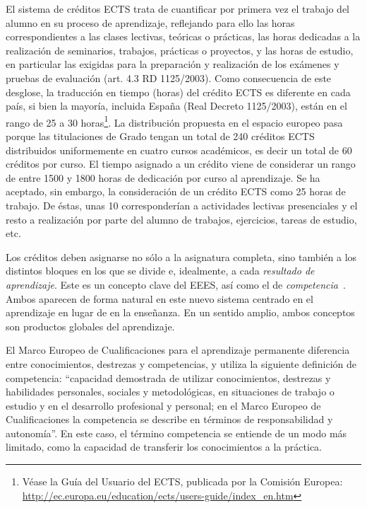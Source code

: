 El sistema de créditos ECTS trata de cuantificar por primera vez el trabajo del alumno en su proceso de aprendizaje, reflejando para ello las horas correspondientes a las clases lectivas, teóricas o prácticas, las horas dedicadas a la realización de seminarios, trabajos, prácticas o proyectos, y las horas de estudio, en particular las exigidas para la preparación y realización de los exámenes y pruebas de evaluación (art. 4.3 RD 1125/2003). Como consecuencia de este desglose, la traducción en tiempo (horas) del crédito ECTS es diferente en cada país, si bien la mayoría, incluida España (Real Decreto 1125/2003), están en el rango de 25 a 30 horas\footnote{Véase la Guía del Usuario del ECTS, publicada por la Comisión Europea: \url{http://ec.europa.eu/education/ects/users-guide/index_en.htm}}. La distribución propuesta en el espacio europeo pasa porque las titulaciones de Grado tengan un total de 240 créditos ECTS distribuidos uniformemente en cuatro cursos académicos, es decir un total de 60 créditos por curso. El tiempo asignado a un crédito viene de considerar un rango de entre 1500 y 1800 horas de dedicación por curso al aprendizaje. Se ha aceptado, sin embargo, la consideración de un crédito ECTS como 25 horas de trabajo. De éstas, unas 10 corresponderían a actividades lectivas presenciales y el resto a realización por parte del alumno de trabajos, ejercicios, tareas de estudio, etc. 

Los créditos deben asignarse no sólo a la asignatura completa, sino también a los distintos bloques en los que se divide e, idealmente, a cada \emph{resultado de aprendizaje}. Este es un concepto clave del EEES, así como el de \emph{competencia}~\cite{yaniz_villardon_2006}. Ambos aparecen de forma natural en este nuevo sistema centrado en el aprendizaje en lugar de en la enseñanza. En un sentido amplio, ambos conceptos son productos globales del aprendizaje.

El Marco Europeo de Cualificaciones para el aprendizaje permanente diferencia entre conocimientos, destrezas y competencias, y utiliza la siguiente definición de competencia: ``capacidad demostrada de utilizar conocimientos, destrezas y habilidades personales, sociales y metodológicas, en situaciones de trabajo o estudio y en el desarrollo profesional y personal; en el Marco Europeo de Cualificaciones la competencia se describe en términos de responsabilidad y autonomía''. En este caso, el término competencia se entiende de un modo más limitado, como la capacidad de transferir los conocimientos a la práctica.

